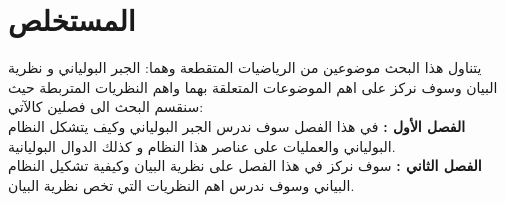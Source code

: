 \chapter*{المستخلص}

يتناول هذا البحث موضوعين من الرياضيات المتقطعة وهما: الجبر البولياني و نظرية البيان وسوف نركز على اهم الموضوعات المتعلقة بهما واهم النظريات المتربطة حيث سنقسم البحث الى فصلين كالآتي:\\
\noindent
\textbf{الفصل الأول :} في هذا الفصل سوف ندرس الجبر البولياني وكيف يتشكل النظام البولياني والعمليات على عناصر هذا النظام و كذلك الدوال البوليانية.\\
\noindent
\textbf{الفصل الثاني :} سوف نركز في هذا الفصل على نظرية البيان وكيفية تشكيل النظام البياني وسوف ندرس اهم النظريات التي تخص نظرية البيان.